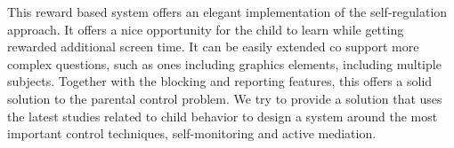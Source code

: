 This reward based system offers an elegant implementation of the self-regulation approach. It offers a nice opportunity for the child to learn while getting rewarded additional screen time. It can be easily extended co support more complex questions, such as ones including graphics elements, including multiple subjects. Together with the blocking and reporting features, this offers a solid solution to the parental control problem. We try to provide a solution that uses the latest studies related to child behavior to design a system around the most important control techniques, self-monitoring and active mediation.


